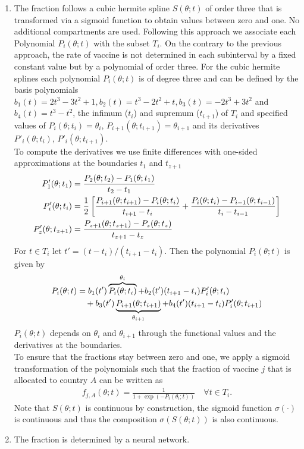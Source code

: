 \begin{enumerate}
\item The fraction follows a cubic hermite spline $S(\theta; t)$ of order three that is transformed via a sigmoid function to obtain values between zero and one. No additional compartments are used. 
Following this approach we associate each Polynomial $P_{i}(\theta; t)$ with the subset $T_i$. On the contrary to the previous approach, the rate of vaccine is not determined in each subinterval by a fixed constant value but by a polynomial of order three. For the cubic hermite splines each polynomial $P_{i}(\theta; t)$ is of degree three and can be defined by the basis polynomials $b_1(t) = 2t^3 - 3t^2 +1, b_2(t) = t^3 - 2t^2 +t, b_3(t) = -2t^3 + 3t^2$ and
$b_4(t) = t^3 - t^2$, the infimum ($t_i$) and supremum ($t_{i+1}$) of $T_i$ and specified values of $P_{i}(\theta; t_i) = \theta_i$, $P_{i+1}(\theta; t_{i+1})=\theta_{i+1}$ and its derivatives $P'_{i}(\theta; t_i)$, $P'_{i}(\theta; t_{i+1})$.\\
To compute the derivatives we use finite differences with one-sided approximations at the boundaries $t_1$ and $t_{z+1}$
\begin{align*}
P'_{1}(\theta; t_1) &= \frac{P_{2}(\theta; t_2) - P_{1}(\theta; t_1)}{t_2 - t_1} \notag \\
P'_{i}(\theta; t_i) &= \frac{1}{2}\left[\frac{P_{i+1}(\theta; t_{i+1}) - P_{i}(\theta; t_i)}{t_{i+1} - t_i} + \frac{P_{i}(\theta; t_{i}) - P_{i-1}(\theta; t_{i-1})}{t_{i} - t_{i-1}} \right] \notag \\
P'_{z}(\theta; t_{z+1}) &= \frac{P_{z+1}(\theta; t_{z+1}) - P_{z}(\theta; t_z)}{t_{z+1} - t_z}
\end{align*}
For $t \in T_i$ let $t' = (t-t_i)/(t_{i+1} - t_i)$. Then the polynomial $P_{i}(\theta; t) $ is given by 
\begin{align*}
P_{i}(\theta; t) &= b_1(t') \overbrace{P_{i}(\theta; t_i)}^{\theta_i} + b_2(t') (t_{i+1} - t_i) P'_{i}(\theta; t_i) \notag \\& \quad + b_3(t') \underbrace{P_{i+1}(\theta; t_{i+1})}_{\theta_{i+1}} + b_4(t') (t_{i+1} - t_i) P'_{i}(\theta; t_{i+1})
\end{align*}
$P_{i}(\theta; t)$ depends on $\theta_i$ and $\theta_{i+1}$ through the functional values and the derivatives at the boundaries.  \\
To ensure that the fractions stay between zero and one, we apply a sigmoid transformation of the polynomials such that the fraction of vaccine $j$ that is allocated to country $A$ can be written as
\begin{align}
f_{j,A}(\theta; t) =  \frac{1}{1 + \exp{(-P_{i}(\theta_i; t))}} \quad \forall t \in T_i. 
\end{align}
Note that $S(\theta; t)$ is continuous by construction, the sigmoid function $\sigma(\cdot)$ is continuous and thus the composition $\sigma(S(\theta; t))$ is also continuous.


\item The fraction is determined by a neural network. 
\end{enumerate}    

